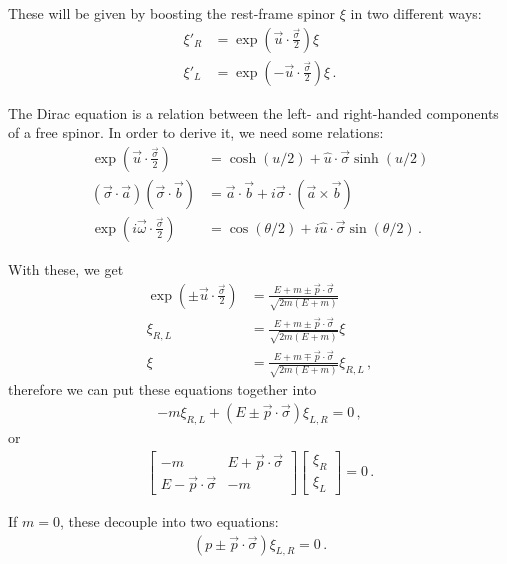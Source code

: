 \documentclass[main.tex]{subfiles}
\begin{document}
These will be given by boosting the rest-frame spinor \(\xi \) in two different ways: 
%
\begin{align}
\xi'_R &= \exp( \vec{u} \cdot \frac{\vec{\sigma}}{2}) \xi  \\
\xi'_L &= \exp( - \vec{u} \cdot \frac{\vec{\sigma}}{2}) \xi 
\,.
\end{align}

The Dirac equation is a relation between the left- and right-handed components of a free spinor. 
In order to derive it, we need some relations: 
%
\begin{align}
\exp(\vec{u} \cdot \frac{\vec{\sigma}}{2}) &= \cosh (u /2 ) + \hat{u} \cdot \vec{\sigma} \sinh (u/2)  \\
(\vec{\sigma} \cdot \vec{a}) (\vec{\sigma} \cdot \vec{b}) &= \vec{a} \cdot \vec{b} + i \vec{\sigma} \cdot \left(\vec{a} \times \vec{b}\right)  \\
\exp(i \vec{\omega } \cdot \frac{\vec{\sigma}}{2}) &= \cos(\theta /2) + i \hat{u} \cdot \vec{\sigma} \sin (\theta /2)
\,.
\end{align}

With these, we get 
%
\begin{align}
\exp(\pm \vec{u} \cdot \frac{\vec{\sigma}}{2}) &= \frac{E + m \pm \vec{p} \cdot \vec{\sigma}}{\sqrt{2 m (E+m)}}  \\
\xi_{R, L} &= \frac{E + m \pm \vec{p} \cdot \vec{\sigma}}{\sqrt{2 m (E+m)}} \xi  \\
\xi &= \frac{E + m \mp \vec{p} \cdot \vec{\sigma}}{\sqrt{2 m (E+m)}} \xi_{R, L}
\,,
\end{align}
%
therefore we can put these equations together into 
%
\begin{align}
- m \xi_{R, L} + \left(E \pm \vec{p} \cdot \vec{\sigma} \right) \xi_{L, R} = 0
\,,
\end{align}
%
or 
%
\begin{align}
\left[\begin{array}{cc}
-m & E + \vec{p} \cdot \vec{\sigma} \\ 
E - \vec{p} \cdot \vec{\sigma} & -m
\end{array}\right]
\left[\begin{array}{c}
\xi _R \\ 
\xi _L
\end{array}\right]
= 0
\,.
\end{align}


If \(m = 0\), these decouple into two equations: 
%
\begin{align}
(p \pm \vec{p} \cdot \vec{\sigma}) \xi_{L, R} = 0
\,.
\end{align}
\end{document}
